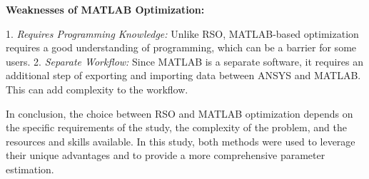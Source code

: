 \textbf{Weaknesses of MATLAB Optimization:}

	1. \textit{Requires Programming Knowledge:} Unlike RSO, MATLAB-based optimization requires a good understanding of programming, which can be a barrier for some users.
	2. \textit{Separate Workflow:} Since MATLAB is a separate software, it requires an additional step of exporting and importing data between ANSYS and MATLAB. This can add complexity to the workflow.

In conclusion, the choice between RSO and MATLAB optimization depends on the specific requirements of the study, the complexity of the problem, and the resources and skills available. In this study, both methods were used to leverage their unique advantages and to provide a more comprehensive parameter estimation.



%






